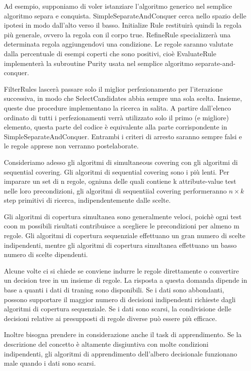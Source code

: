 \documentclass[a4paper]{extarticle}
\begin{document}
Ad esempio, supponiamo di voler istanziare l'algoritmo generico nel semplice algoritmo separa e conquista. SimpleSeparateAndConquer cerca nello spazio delle ipotesi in modo dall'alto verso il basso. Initialize Rule restituirà quindi la regola più generale, ovvero la regola con il corpo {true}. RefineRule specializzerà una determinata regola aggiungendovi una condizione. Le regole saranno valutate dalla percentuale di esempi coperti che sono positivi, cioè EvaluateRule implementerà la subroutine Purity usata nel semplice algoritmo separate-and-conquer.

FilterRules lascerà passare solo il miglior perfezionamento per l'iterazione successiva, in modo che SelectCandidates abbia sempre una sola scelta. Insieme, queste due procedure implementano la ricerca in salita. A partire dall'elenco ordinato di tutti i perfezionamenti verrà utilizzato solo il primo (e migliore) elemento, questa parte del codice è equivalente alla parte corrispondente in SimpleSeparateAndConquer. Entrambi i criteri di arresto saranno sempre falsi e le regole apprese non verranno postelaborate.

Consideriamo adesso gli algoritmi di simultaneous covering con gli algoritmi di sequential covering. Gli algoritmi di sequential covering sono i più lenti. Per imparare un set di n regole, ogniuna delle quali contiene k attribute-value test nelle loro precondizioni, gli algoritmi di sequentiial covering performeranno $n \times k$ step primitivi di ricerca, indipendentemente dalle scelte.

Gli algoritmi di copertura simultanea sono generalmente veloci, poichè ogni test coon m possibili risultati contribuisce a scegliere le precondizioni per almeno m regole. Gli algoritmi di copertura sequenziale effettuano un gran numero di scelte indipendenti, mentre gli algoritmi di copertura simultanea effettuano un basso numero di scelte dipendenti.

Alcune volte ci si chiede se conviene indurre le regole direttamente o convertire un decision tree in un insieme di regole. La risposta a questa domanda dipende in base a quanti i dati di traning sono disponibili. Se i dati sono abbondanti, possono supportare il maggior numero di decisioni indipendenti richieste dagli algoritmi di copertura sequenziale. Se i dati sono scarsi, la condivisione delle decisioni relative ai presupposti di regole diverse può essere più efficace.

Inoltre bisogna prendere in considerazione anche il task di apprendimento. Se la descrizione del concetto è altamente disgiuntiva con molte condizioni indipendenti, gli algoritmi di apprendimento dell'albero decisionale funzionano male quando i dati sono scarsi.
\end{document}

